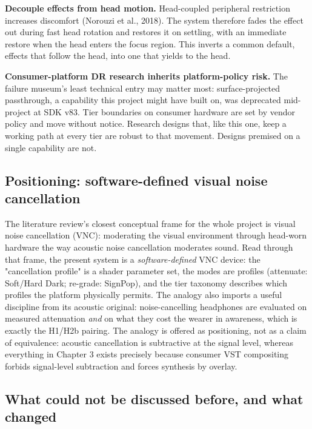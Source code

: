 \textbf{Decouple effects from head motion.} Head-coupled peripheral restriction increases discomfort
(Norouzi et al., 2018). The system therefore fades the effect out during fast head rotation and
restores it on settling, with an immediate restore when the head enters the focus region. This
inverts a common default, effects that follow the head, into one that yields to the head.

\textbf{Consumer-platform DR research inherits platform-policy risk.} The failure museum's least
technical entry may matter most: surface-projected passthrough, a capability this project might have
built on, was deprecated mid-project at SDK v83. Tier boundaries on consumer hardware are set by
vendor policy and move without notice. Research designs that, like this one, keep a working path at
every tier are robust to that movement. Designs premised on a single capability are not.

\subsection{Positioning: software-defined visual noise cancellation}

The literature review's closest conceptual frame for the whole project is visual noise cancellation
(VNC): moderating the visual environment through head-worn hardware the way acoustic noise
cancellation moderates sound. Read through that frame, the present system is a \textit{software-defined}
VNC device: the "cancellation profile" is a shader parameter set, the modes are profiles
(attenuate: Soft/Hard Dark; re-grade: SignPop), and the tier taxonomy describes which profiles the
platform physically permits. The analogy also imports a useful discipline from its acoustic
original: noise-cancelling headphones are evaluated on measured attenuation \textit{and} on what they cost
the wearer in awareness, which is exactly the H1/H2b pairing. The analogy is offered as
positioning, not as a claim of equivalence: acoustic cancellation is subtractive at the signal
level, whereas everything in Chapter 3 exists precisely because consumer VST compositing forbids
signal-level subtraction and forces synthesis by overlay.

\subsection{What could not be discussed before, and what changed}

